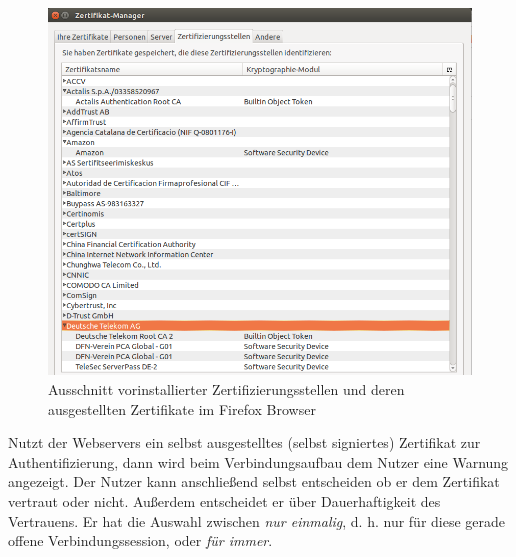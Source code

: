 \begin{figure}[H]
		\centering
		\includegraphics[width=0.5\linewidth]{images/Zertifizierungsstellen.png}
		\caption{Ausschnitt vorinstallierter Zertifizierungsstellen und deren ausgestellten Zertifikate im Firefox Browser}
\end{figure}
Nutzt der Webservers ein selbst ausgestelltes (selbst signiertes) Zertifikat zur Authentifizierung, dann wird beim Verbindungsaufbau dem Nutzer eine Warnung angezeigt. Der Nutzer kann anschließend selbst entscheiden ob er dem Zertifikat vertraut oder nicht. Außerdem entscheidet er über Dauerhaftigkeit des Vertrauens. Er hat die Auswahl zwischen \textit{nur einmalig}, d. h. nur für diese gerade offene Verbindungssession, oder \textit{für immer}. 

